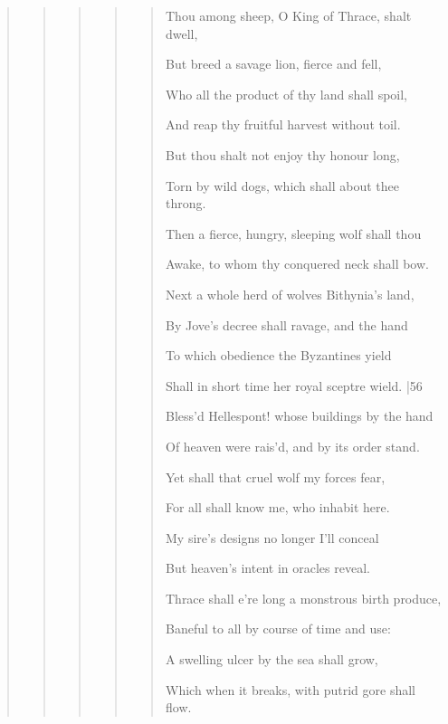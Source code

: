 \begin{quote}

\begin{quote}

\begin{quote}

\begin{quote}

\begin{quote}

Thou among sheep, O King of Thrace, shalt dwell, 

But breed a savage lion, fierce and fell, 

Who all the product of thy land shall spoil, 

And reap thy fruitful harvest without toil. 

But thou shalt not enjoy thy honour long, 

Torn by wild dogs, which shall about thee throng. 

Then a fierce, hungry, sleeping wolf shall thou 

Awake, to whom thy conquered neck shall bow. 

Next a whole herd of wolves Bithynia's land, 

By Jove's decree shall ravage, and the hand 

To which obedience the Byzantines yield

Shall in short time her royal sceptre wield. |56 

Bless'd Hellespont! whose buildings by the hand 

Of heaven were rais'd, and by its order stand. 

Yet shall that cruel wolf my forces fear, 

For all shall know me, who inhabit here. 

My sire's designs no longer I'll conceal 

But heaven's intent in oracles reveal.

Thrace shall e're long a monstrous birth produce,

Baneful to all by course of time and use:

A swelling ulcer by the sea shall grow,

Which when it breaks, with putrid gore shall flow.

\end{quote}

\end{quote}

\end{quote}

\end{quote}

\end{quote}

